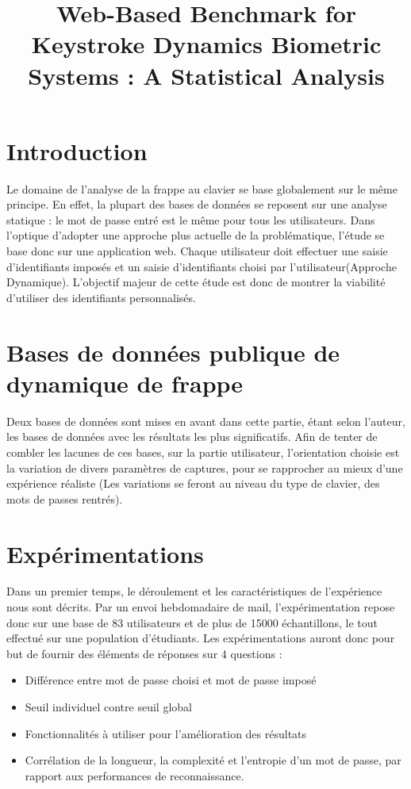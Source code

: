 \documentclass[a4paper,11pt]{article}
\begin{document}
	
\title{Web-Based Benchmark for Keystroke Dynamics Biometric Systems : A Statistical Analysis\cite{giotWeb}}
\maketitle

\section{Introduction}

	Le domaine de l'analyse de la frappe au clavier se base globalement sur le même principe.
En effet, la plupart des bases de données se reposent sur une analyse statique : le mot de passe entré est le même pour tous les utilisateurs. 
Dans l'optique d'adopter une approche plus actuelle de la problématique, l'étude se base donc sur une application web. Chaque utilisateur doit effectuer une saisie d'identifiants imposés et un saisie d'identifiants choisi par l'utilisateur(Approche Dynamique). L'objectif majeur de cette étude est donc de montrer la viabilité d'utiliser des identifiants personnalisés.

 \section{Bases de données publique de dynamique de frappe}
 
	Deux bases de données sont mises en avant dans cette partie, étant selon l'auteur, les bases de données avec les résultats les plus significatifs. Afin de tenter de combler les lacunes de ces bases, sur la partie utilisateur, l'orientation choisie est la variation de divers paramètres de captures, pour se rapprocher au mieux d'une expérience réaliste (Les variations se feront au niveau du type de clavier, des mots de passes rentrés).

\section{Expérimentations}

	Dans un premier temps, le déroulement et les caractéristiques de l'expérience nous sont décrits. Par un envoi hebdomadaire de mail, l'expérimentation repose donc sur une base de 83 utilisateurs  et de plus de 15000 échantillons, le tout effectué sur une population d'étudiants. Les expérimentations auront donc pour but de fournir des éléments de réponses sur 4 questions :

\begin{itemize}
\item Différence entre mot de passe choisi et mot de passe imposé 
\item Seuil individuel contre seuil global 
\item Fonctionnalités à utiliser pour l'amélioration des résultats
\item Corrélation de la longueur, la complexité et l'entropie d'un mot de passe, par rapport aux performances de reconnaissance.
\end{itemize}
\end{document}
